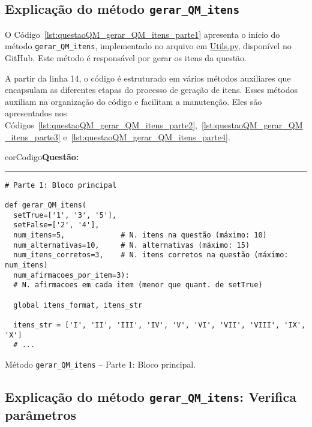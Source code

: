 \subsection{Explicação do método \texttt{gerar\_QM\_itens}}\label{sec:metodo_Gerar_QM_itens}

O Código~\ref{lst:questaoQM_gerar_QM_itens_parte1} apresenta o início do método \verb|gerar_QM_itens|, implementado no arquivo em \href{https://github.com/fzampirolli/mctest/blob/master/topic/Utils.py}{Utils.py}, disponível no GitHub. Este método é responsável por gerar os itens da questão.

A partir da linha 14, o código é estruturado em vários métodos auxiliares que encapsulam as diferentes etapas do processo de geração de itens. Esses métodos auxiliam na organização do código e facilitam a manutenção. Eles são apresentados nos Códigos~\ref{lst:questaoQM_gerar_QM_itens_parte2},~\ref{lst:questaoQM_gerar_QM_itens_parte3} e~\ref{lst:questaoQM_gerar_QM_itens_parte4}.

\begin{listing}[!ht]
  \begin{myboxCode}{corCodigo}{\textbf{Questão: }}\vspace{3mm}
  \hrule
  \begin{verbatim}
# Parte 1: Bloco principal

def gerar_QM_itens(
  setTrue=['1', '3', '5'], 
  setFalse=['2', '4'], 
  num_itens=5,             # N. itens na questão (máximo: 10)
  num_alternativas=10,     # N. alternativas (máximo: 15)
  num_itens_corretos=3,    # N. itens corretos na questão (máximo: num_itens)
  num_afirmacoes_por_item=3): 
  # N. afirmacoes em cada item (menor que quant. de setTrue)
    
  global itens_format, itens_str

  itens_str = ['I', 'II', 'III', 'IV', 'V', 'VI', 'VII', 'VIII', 'IX', 'X']
  # ...
\end{verbatim}
\end{myboxCode}
\caption{Método \texttt{gerar\_QM\_itens} -- Parte 1: Bloco principal.}
\label{lst:questaoQM_gerar_QM_itens_parte1}
\end{listing}

\subsection{Explicação do método \texttt{gerar\_QM\_itens}: Verifica parâmetros}\label{sec:verificaParametros}

